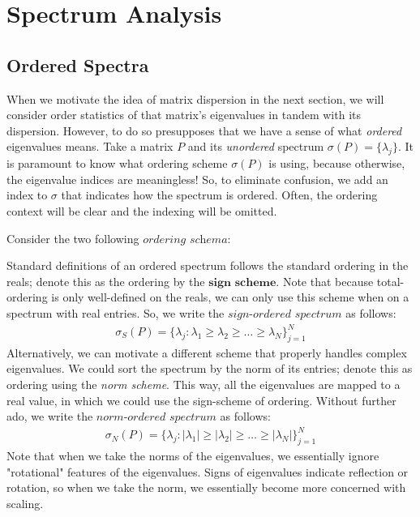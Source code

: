 \section{Spectrum Analysis}


\subsection{Ordered Spectra}

When we motivate the idea of matrix dispersion in the next section, we will consider order statistics of that matrix's eigenvalues in tandem with its dispersion.
However, to do so presupposes that we have a sense of what \textit{ordered} eigenvalues means.
Take a matrix $P$ and its \textit{unordered} spectrum $\sigma(P) = \{\lambda_j\}$.
It is paramount to know what ordering scheme $\sigma(P)$ is using, because otherwise, the eigenvalue indices are meaningless!
So, to eliminate confusion, we add an index to $\sigma$ that indicates how the spectrum is ordered.
Often, the ordering context will be clear and the indexing will be omitted.


\noindent Consider the two following $\textit{ordering schema}$:

Standard definitions of an ordered spectrum follows the standard ordering in the reals; denote this as the ordering by the $\textbf{sign scheme}$.
Note that because total-ordering is only well-defined on the reals, we can only use this scheme when on a spectrum with real entries.
So, we write the $\textit{sign-ordered spectrum}$ as follows:
\begin{align*}
\sigma_S(P) = \{\lambda_j : \lambda_1 \geq \lambda_2 \geq \dots \geq \lambda_N\}_{j = 1}^N
\end{align*}
Alternatively, we can motivate a different scheme that properly handles complex eigenvalues.
We could sort the spectrum by the norm of its entries; denote this as ordering using the \textit{norm scheme}.
This way, all the eigenvalues are mapped to a real value, in which we could use the sign-scheme of ordering.
Without further ado, we write the $\textit{norm-ordered spectrum}$ as follows:
\begin{align*}
\sigma_N(P) = \{\lambda_j : |\lambda_1| \geq |\lambda_2| \geq \dots \geq |\lambda_N|\}_{j = 1}^N
\end{align*}
Note that when we take the norms of the eigenvalues, we essentially ignore "rotational" features of the eigenvalues.
Signs of eigenvalues indicate reflection or rotation, so when we take the norm, we essentially become more concerned with scaling.

